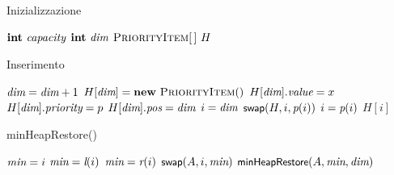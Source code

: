 \begin{frame}{Inizializzazione}
    
\vspace{-9pt}
\begin{Procedure}
\caption[A]{\Heap}
$\INTEGER\ \heapsize$
$\INTEGER\ \heapcount$
$\textsc{PriorityItem}[\,]\ H$
\BlankLine

\end{Procedure}

\end{frame}

\begin{frame}{Inserimento}

\vspace{-9pt}
\begin{Procedure}
\caption[A]{\PriorityItem\ \heapinsert(\Item $x$, \INTEGER\ $p$)}
\precondition{$\heapcount < \heapsize$}
\BlankLine
$\textit{dim} = \textit{dim}+1$\;
$H[\heapcount] = \NEW\ \PriorityItem()$\;
$H[\textit{dim}].\textit{value} = x$\;
$H[\textit{dim}].\textit{priority} = p$\;
$H[\textit{dim}].\textit{pos} = \textit{dim}$\;
\INTEGER $i = \textit{dim}$\;
{
  $\textsf{{\small swap}}(H, i, \textit{p}(i))$\;
  $i = \textit{p}(i)$\;
}
\Return $H[i]$\;
\end{Procedure}


\end{frame}

\begin{frame}{minHeapRestore()}
    
\vspace{-9pt}
\begin{Procedure}
\caption[A]{\minheapify($\PriorityItem[\,]\ A$, \INTEGER $i$, \INTEGER \heapcount)}

\INTEGER $\textit{min} = i$\;
{
  $\textit{min} = \textit{l}(i)$
}
{
  $\textit{min} = \textit{r}(i)$
}
{
  $\textsf{{\small swap}}(A, i, \textit{min})$\;
  $\textsf{{\small minHeapRestore}}(A, \textit{min}, \textit{dim})$\;
}
\end{Procedure}

\end{frame}

